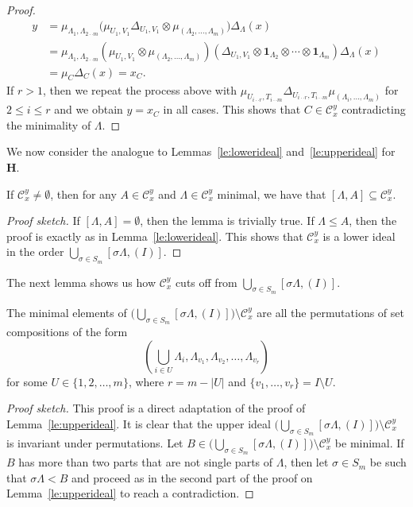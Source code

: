 \documentclass[ALCO,ThmDefs,Unicode,epreuves]{cedram}
\def\Id{\mathbf{1}}
\newcommand{\bH}{\mathbf{H}}
\begin{document}
\begin{proof}
$$\begin{aligned}
 y &=\mu_{\Lambda_1,\Lambda_{2\cdot\cdot m}} \big( \mu_{U_1,V_1} \Delta_{U_1,V_1}\otimes \mu_{(\Lambda_2,\ldots,\Lambda_m)}\big)\Delta_\Lambda(x)\\
 &=\mu_{\Lambda_1,\Lambda_{2\cdot\cdot m}} ( \mu_{U_1,V_1}\otimes \mu_{(\Lambda_2,\ldots,\Lambda_m)})( \Delta_{U_1,V_1}\otimes \Id_{\Lambda_2}\otimes\cdots\otimes\Id_{\Lambda_m} )\Delta_\Lambda(x)\\
 &=\mu_C\Delta_C(x)=x_C.
 \end{aligned}$$
If $r>1$, then we repeat the process above with $ \mu_{U_{i\cdot\cdot r},T_{i\cdot\cdot m}}\Delta_{U_{i\cdot\cdot r},T_{i\cdot\cdot m}} \mu_{(\Lambda_i,\ldots,\Lambda_m)}$ for $2\le i\le r$ and we obtain
$y=x_C$ in all cases. This shows that $C\in \mathcal{C}_{x}^{y}$ contradicting the minimality of $\Lambda$.
\end{proof}

We now consider the analogue to Lemmas~\ref{le:lowerideal} and~\ref{le:upperideal} for $\bH$.

\begin{lemma}\label{le:Hlowerideal}
If $\mathcal{C}_{x}^{y}\ne\emptyset$, then for any $A\in\mathcal{C}_{x}^{y}$ and $\Lambda\in\mathcal{C}_{x}^{y}$ minimal, we have that 
$[\Lambda,A]\subseteq \mathcal{C}_{x}^{y}$.
\end{lemma}

\begin{proof}[Proof sketch] 
If $[\Lambda,A]=\emptyset$, then the lemma is trivially true. If $\Lambda\le A$, then the proof is exactly as in Lemma~\ref{le:lowerideal}.
This shows that $\mathcal{C}_{x}^{y}$ is a lower ideal in the order $\bigcup_{\sigma\in S_m} [\sigma\Lambda,(I)]$. \end{proof}
The next lemma shows us how $\mathcal{C}_{x}^{y}$
cuts off from $\bigcup_{\sigma\in S_m} [\sigma\Lambda,(I)]$.


\begin{lemma}\label{le:Hupperideal}
The minimal elements of $\big(\bigcup_{\sigma\in S_m} [\sigma\Lambda,(I)]\big)\setminus \mathcal{C}_{x}^{y}$ are all the permutations of set compositions of the form
 $$(\bigcup_{i\in U} \Lambda_i,\Lambda_{v_1},\Lambda_{v_2},\ldots,\Lambda_{v_r})$$
for some $U\in\{1,2,\ldots,m\}$, where $r=m-|U|$ and $\{v_1,\ldots,v_r\}=I\setminus U$. 
\end{lemma}

\begin{proof}[Proof sketch] 
This proof is a direct adaptation of the proof of Lemma~\ref{le:upperideal}. It is clear that the upper ideal $\big(\bigcup_{\sigma\in S_m} [\sigma\Lambda,(I)]\big)\setminus \mathcal{C}_{x}^{y}$ is invariant under permutations. Let $B\in \big(\bigcup_{\sigma\in S_m} [\sigma\Lambda,(I)]\big)\setminus \mathcal{C}_{x}^{y}$ be minimal. If $B$ has more than two parts that are not single parts of $\Lambda$, then let $\sigma\in S_m$ be such that $\sigma\Lambda<B$ and proceed as in the second part of the proof on Lemma~\ref{le:upperideal} to reach a contradiction.
\end{proof}
\end{document}
